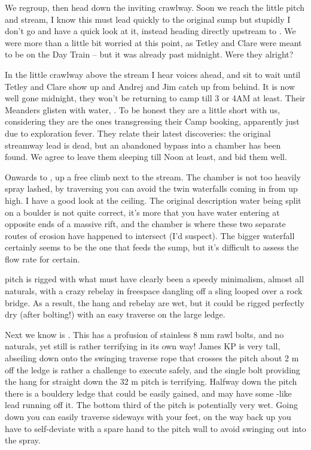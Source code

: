 We regroup, then head down the inviting crawlway. Soon we reach the
little pitch and stream, I know this must lead quickly to the original
 sump but stupidly I don't go and have a quick look at it,
instead heading directly upstream to . We were more
than a little bit worried at this point, as Tetley and Clare were meant
to be on the Day Train -- but it was already past midnight. Were they
alright?

In the little crawlway above the stream I hear voices ahead, and sit to
wait until Tetley and Clare show up and Andrej and Jim catch up from
behind. It is now well gone midnight, they won't be returning to camp
till 3 or 4AM at least. Their Meanders glisten with water, . To
be honest they are a little short with us, considering they are the ones
transgressing their Camp  booking, apparently just due to
exploration fever. They relate their latest discoveries: the original
streamway lead is dead, but an abandoned bypass into a chamber has been
found. We agree to leave them sleeping till Noon at least, and bid them
well.

Onwards to , up a free climb next to the stream. The
chamber is not too heavily spray lashed, by traversing you can avoid the
twin waterfalls coming in from up high. I have a good look at the
ceiling. The original description water being split on a boulder is not
quite correct, it's more that you have water entering at opposite ends
of a massive rift, and the  chamber is where these two
separate routes of erosion have happened to intersect (I'd suspect). The
bigger waterfall certainly seems to be the one that feeds the 
sump, but it's difficult to assess the flow rate for certain.

 pitch is rigged with what must have clearly been a
speedy minimalism, almost all naturals, with a crazy rebelay in
freespace dangling off a sling looped over a rock bridge. As a result,
the hang and rebelay are wet, but it could be rigged perfectly dry
(after bolting!) with an easy traverse on the large ledge.

Next we know is . This has a profusion of stainless 8 mm
rawl bolts, and no naturals, yet still is rather terrifying in its own
way! James KP is very tall, abseiling down onto the swinging traverse
rope that crosses the pitch about 2 m off the ledge is rather a
challenge to execute safely, and the single bolt providing the hang for
straight down the 32 m pitch is terrifying. Halfway down the pitch there
is a bouldery ledge that could be easily gained, and may have some
-like lead running off it. The bottom third of the pitch
is potentially very wet. Going down you can easily traverse sideways
with your feet, on the way back up you have to self-deviate with a spare
hand to the pitch wall to avoid swinging out into the spray.

